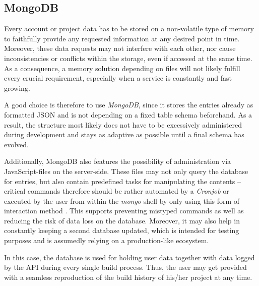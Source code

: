 \subsection{MongoDB}
Every account or project data has to be stored on a non-volatile type of memory to faithfully provide any requested information at any desired point in time. Moreover, these data requests may not interfere with each other, nor cause inconsistencies or conflicts within the storage, even if accessed at the same time. As a consequence, a memory solution depending on files will not likely fulfill every crucial requirement, especially when a service is constantly and fast growing.

A good choice is therefore to use \emph{MongoDB}, since it stores the entries already as formatted JSON and is not depending on a fixed table schema beforehand. As a result, the structure most likely does not have to be excessively administered during development and stays as adaptive as possible until a final schema has evolved.

Additionally, MongoDB also features the possibility of administration via
JavaScript-files on the server-side. These files may not only query the database for entries, but also contain predefined tasks for manipulating the contents -- critical commands therefore should be rather automated by a \emph{Cronjob} or executed by the user from within the \emph{mongo} shell by only using this form of interaction method \cite{MongoDBWritingScripts}. This supports preventing mistyped commands as well as reducing the risk of data loss on the database. Moreover, it may also help in constantly keeping a second database updated, which is intended for testing purposes and is assumedly relying on a production-like ecosystem.

In this case, the database is used for holding user data together with data logged by the API during every single build process. Thus, the user may get provided with a seamless reproduction of the build history of his/her project at any time.
